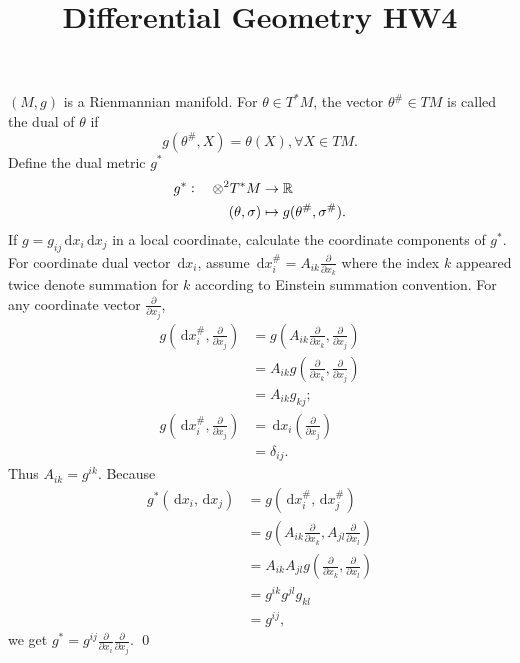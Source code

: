 

\title{Differential Geometry HW4}
\author{\asemail}
\maketitle
\def\t{T\!\!}%
\def\d{\,\mathrm{d}}
\def\f #1{\frac{\partial }{\partial {#1}}}%
\begin{enumerate}
\isep[1em]

\prob
$(M,g)$ is a Rienmannian manifold. 
For $\theta \in T^*M$, the vector $\theta^\# \in TM$ is called the dual of $\theta$ if $$
g(\theta^\#,X)=\theta(X), \forall X\in TM.$$
Define the dual metric $g^*$ 
\begin{align*}
	g^*:\quad \otimes^2 T^*M &\to \mathbb{R} \\
	(\theta,\sigma) &\mapsto g(\theta^\#,\sigma^\#).
\end{align*}
If $g=g_{ij}\d x_i \d x_j$ in a local coordinate, calculate the coordinate components of $g^*$.
\soln
For coordinate dual vector $\d x_i$, assume $\d x_i^\#=A_{ik}\f{x_k}$ where the index $k$ appeared twice denote summation for $k$ according to Einstein summation convention. 
For any coordinate vector $\f{x_j}$, \begin{align*}
	g(\d x_i^\#, \f{x_j}) &= g(A_{ik}\f{x_k}, \f{x_j}) \\
	&= A_{ik}g(\f{x_k},\f{x_j}) \\
	&= A_{ik}g_{kj}; \\
	g(\d x_i^\#, \f{x_j}) &= \d x_i(\f{x_j}) \\
	&= \delta_{ij}.
\end{align*}
Thus $A_{ik}=g^{ik}$. Because \begin{align*}
	g^*(\d x_i,\d x_j) &= g(\d x_i^\#,\d x_j^\#) \\
	&= g(A_{ik}\f{x_k}, A_{jl}\f{x_l}) \\
	&= A_{ik}A_{jl}g(\f{x_k},\f{x_l}) \\
	&= g^{ik}g^{jl}g_{kl} \\
	&= g^{ij},
\end{align*}
we get $g^*=g^{ij} \f{x_i}\f{x_j}$.
\qed


\end{enumerate}
